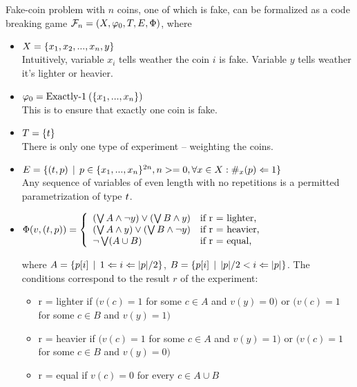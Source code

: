 
\begin{example}
Fake-coin problem with $n$ coins, one of which is fake, can be formalized as
a code breaking game
$\mathcal{F}_n = (X, \varphi_0, T, E, \Phi)$, where

\begin{itemize}
\item
$X = \{x_1, x_2, ..., x_n, y\}$ \\
Intuitively, variable $x_i$ tells weather the coin $i$ is fake.
Variable $y$ tells weather it's lighter or heavier.

\item
$\varphi_0 = \textrm{Exactly-1}\:(\{x_1, ..., x_n\})$ \\
This is to ensure that exactly one coin is fake.

\item
$T = \{t\}$ \\
There is only one type of experiment -- weighting the coins.

\item
$E = \{ (t, p) \:\:|\:\:
  p \in \{x_1, ..., x_n\}^{2n},
  n >= 0,
  \forall x\in X: \#_x(p)<=1 \} $\\
Any sequence of variables of even length with no repetitions
  is a permitted parametrization of type $t$.

\item
$\Phi(v, (t, p)) = \left\{
\begin{array}{ll}
(\bigvee A \wedge \neg y) \vee (\bigvee B \wedge y) &
    \textrm{if r = lighter,} \\
(\bigvee A \wedge y) \vee (\bigvee B \wedge \neg y) &
    \textrm{if r = heavier,} \\
\neg \bigvee(A\cup B) &
    \textrm{if r = equal,}
\end{array} \right.$

where
$A = \{ p[i] \:\:|\:\: 1 <= i <= |p|/2 \}$,
$B = \{ p[i] \:\:|\:\: |p|/2 < i <= |p| \}$.
The conditions correspond to the result $r$ of the experiment:
\begin{itemize}
\item r = lighter if $(v(c) = 1$ for some $c\in A$ and $v(y) = 0)$
  or $(v(c) = 1$ for some $c \in B$ and $v(y) = 1)$
\item r = heavier if $(v(c) = 1$ for some $c\in A$ and $v(y) = 1)$
  or $(v(c) = 1$ for some $c \in B$ and $v(y) = 0)$
\item r = equal if $v(c) = 0$ for every $c\in A\cup B$
\end{itemize}
\end{itemize}
\end{example}

